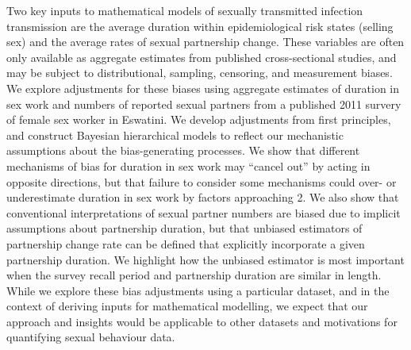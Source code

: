 Two key inputs to mathematical models of sexually transmitted infection transmission are
the average duration within epidemiological risk states (\eg selling sex) and  %
the average rates of sexual partnership change.
These variables are often only available as aggregate estimates from
published cross-sectional studies, and may be subject to
distributional, sampling, censoring, and measurement biases.  %
We explore adjustments for these biases using aggregate estimates of
duration in sex work and numbers of reported sexual partners
from a published 2011 survery of female sex worker in Eswatini.  %
We develop adjustments from first principles,
and construct Bayesian hierarchical models to reflect
our mechanistic assumptions about the bias-generating processes.
We show that different mechanisms of bias for duration in sex work may
``cancel out'' by acting in opposite directions,
but that failure to consider some mechanisms could over- or underestimate  %
duration in sex work by factors approaching 2. 
We also show that conventional interpretations of sexual partner numbers
are biased due to implicit assumptions about partnership duration,
but that unbiased estimators of partnership change rate can be defined
that explicitly incorporate a given partnership duration.
We highlight how the unbiased estimator is most important when
the survey recall period and partnership duration are similar in length.
While we explore these bias adjustments using a particular dataset,
and in the context of deriving inputs for mathematical modelling,
we expect that our approach and insights would be applicable to
other datasets and motivations for quantifying sexual behaviour data. %
